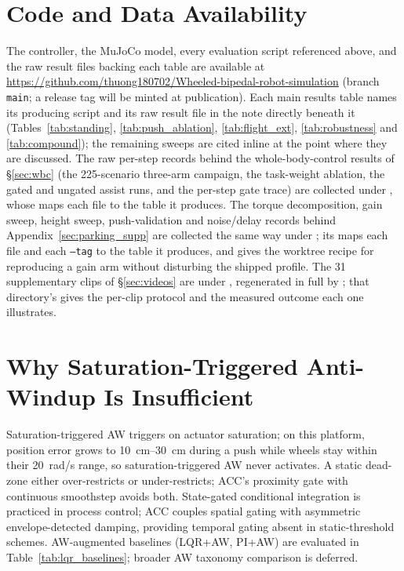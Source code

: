 \documentclass[conference]{IEEEtran}
\begin{document}
\section*{Code and Data Availability}
The controller, the MuJoCo model, every evaluation script referenced above, and the raw result files backing each table are available at \url{https://github.com/thuong180702/Wheeled-bipedal-robot-simulation} (branch \texttt{main}; a release tag will be minted at publication). Each main results table names its producing script and its raw result file in the note directly beneath it (Tables~\ref{tab:standing}, \ref{tab:push_ablation}, \ref{tab:flight_ext}, \ref{tab:robustness} and \ref{tab:compound}); the remaining sweeps are cited inline at the point where they are discussed. The raw per-step records behind the whole-body-control results of \S\ref{sec:wbc} (the 225-scenario three-arm campaign, the task-weight ablation, the gated and ungated assist runs, and the per-step gate trace) are collected under , whose  maps each file to the table it produces. The torque decomposition, gain sweep, height sweep, push-validation and noise/delay records behind Appendix~\ref{sec:parking_supp} are collected the same way under ; its  maps each file and each \texttt{--tag} to the table it produces, and gives the worktree recipe for reproducing a gain arm without disturbing the shipped profile. The \num{31} supplementary clips of \S\ref{sec:videos} are under , regenerated in full by ; that directory's  gives the per-clip protocol and the measured outcome each one illustrates.

\appendices
\section{Why Saturation-Triggered Anti-Windup Is Insufficient}
\label{sec:aw_supp}

Saturation-triggered AW triggers on actuator saturation; on this platform, position error grows to \SIrange{10}{30}{cm} during a push while wheels stay within their \SI{20}{rad/s} range, so saturation-triggered AW never activates. A static dead-zone either over-restricts or under-restricts; ACC's proximity gate with continuous smoothstep avoids both. State-gated conditional integration is practiced in process control; ACC couples spatial gating with asymmetric envelope-detected damping, providing temporal gating absent in static-threshold schemes. AW-augmented baselines (LQR+AW, PI+AW) are evaluated in Table~\ref{tab:lqr_baselines}; broader AW taxonomy comparison is deferred.
\end{document}
